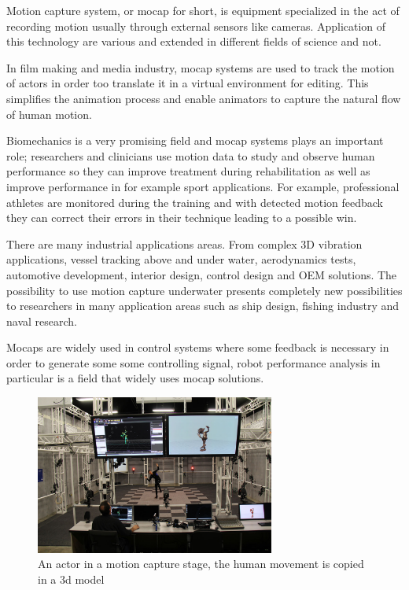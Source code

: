 Motion capture system, or mocap for short, is equipment specialized in the act of recording motion \cite{qualisys} usually through external sensors like cameras. Application of this technology are various and extended in different fields of science and not.\par In film making and media industry, mocap systems are used to track the motion of actors in order too translate it in a virtual environment for editing. This simplifies  the animation process and enable animators to capture the natural flow of human motion.\par Biomechanics is a very promising field and mocap systems plays an important role;  researchers and clinicians use motion data to study and observe human performance so they can improve treatment during rehabilitation as well as improve performance in for example sport applications. For example, professional athletes are monitored during the training and with detected motion feedback they can correct their errors in their technique leading to a possible win.\par There are many industrial applications areas. From complex 3D vibration applications, vessel tracking above and under water, aerodynamics tests, automotive development, interior design, control design and OEM solutions. The possibility to use motion capture underwater presents completely new possibilities to researchers in many application areas such as ship design, fishing industry and naval research.\par Mocaps are widely used in control systems where some feedback is necessary in order to generate some some controlling signal, robot performance analysis in particular is a field that widely uses mocap solutions.\par
\begin{figure}[h]
\centering
 \includegraphics[width=0.7\textwidth]{motionstage.jpg}
 \caption[Motion capture stage]{An actor in a motion capture stage, the human movement is copied in a 3d model}
 \label{figure:motionstage}
\end{figure}

